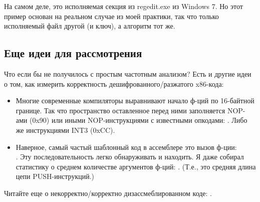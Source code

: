 На самом деле, это исполняемая секция из regedit.exe из Windows 7.
Но этот пример основан на реальном случае из моей практики, так что только исполняемый файл другой (и ключ), а алгоритм тот же.

\subsection{Еще идеи для рассмотрения}

Что если бы не получилось с простым частотным анализом?
Есть и другие идеи о том, как измерить корректность дешифрованного/разжатого x86-кода:

\begin{itemize}

\item Многие современные компиляторы выравнивают начало ф-ций по 16-байтной границе.
Так что пространство оставленное перед ними заполняется NOP-ами (0x90) или иными NOP-инструкциями с известными опкодами: .
Либо же инструкциями INT3 (0xCC).

\item Наверное, самый частый шаблонный код в ассемблере это вызов ф-ции:\\
.
Эту последовательность легко обнаруживать и находить.
Я даже собирал статистику о среднем количестве аргументов ф-ций: .
(Т.е., это средняя длина цепи PUSH-инструкций.)

\end{itemize}

Читайте еще о некорректно/корректно дизассмеблированном коде: .

